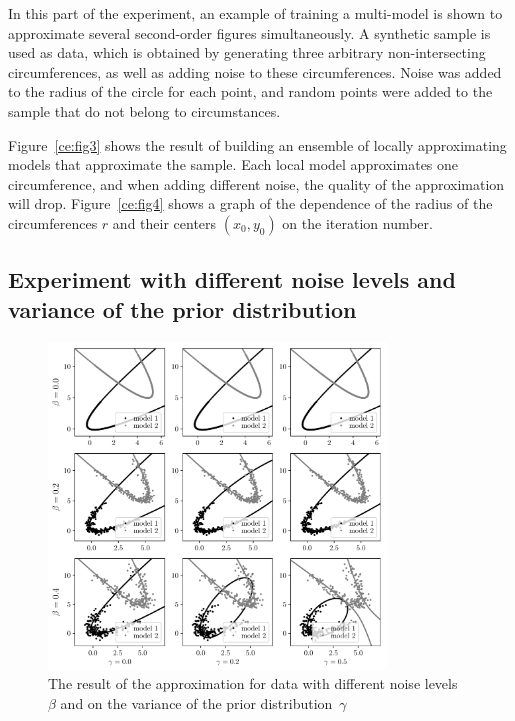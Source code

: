 In this part of the experiment, an example of training a multi-model is shown to approximate several second-order figures simultaneously. A synthetic sample is used as data, which is obtained by generating three arbitrary non-intersecting circumferences, as well as adding noise to these circumferences. Noise was added to the radius of the circle for each point, and random points were added to the sample that do not belong to circumstances.

Figure~\ref{ce:fig3} shows the result of building an ensemble of locally approximating models that approximate the sample. Each local model approximates one circumference, and when adding different noise, the quality of the approximation will drop.
Figure~\ref{ce:fig4} shows a graph of the dependence of the radius of the circumferences $r$ and their centers $(x_0, y_0)$ on the iteration number. 

\subsection{ Experiment with different noise levels and variance of the prior distribution }
\begin{figure}[h!t]
\includegraphics[width=0.8\textwidth]{figures/beta_gamma}
\caption{ The result of the approximation for data with different noise levels~$\beta$ and on the variance of the prior distribution~$\gamma$}
\label{ce:fig6}
\end{figure}

